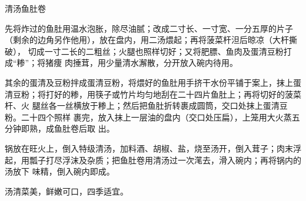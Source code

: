 %
%
%
%
%
%
%
\begin{recipe}{清汤鱼肚卷}

\ingredients


\preparation

\step 先将炸过的鱼肚用温水泡胀，除尽油腻；改成二寸长、一寸宽、一分五厚的片子
（剩余的边角另作他用），放在盘内，用二汤煨起；再将菠菜杆泹后晾凉（大杆撕破），
切成一寸二长的二粗丝；火腿也照样切好；又将肥膘、鱼肉及蛋清豆粉打成“糁”；将猪痩
肉捶茸，用少量清水澥散，分开放入碗内待用。

\step 其余的蛋清及豆粉拌成蛋清豆粉，将煨好的鱼肚用手挤干水份平铺于案上，抹上蛋
清豆粉；将打好的糁，用筷子或竹片均匀地刮在二十四片鱼肚上；再将切好的菠菜杆、火
腿丝各一丝横放于糁上；然后把鱼肚折转裹成圆筒，交口处抹上蛋清豆粉。二十四个照样
裹完，放入抹上一层油的盘内（交口处压扁），上笼用大火蒸五分钟即熟，成鱼肚卷后取
出。

\step 锅放在旺火上，倒入特级清汤，加料酒、胡椒、盐，烧至汤开，倒入茸子；肉末浮
起，用瓢子打尽浮沫及杂质；把鱼肚卷用清汤过一次滗去，滑入碗内；再将锅内的汤放下
味精，倒入碗内即成。

\features

汤清菜美，鲜嫩可口，四季适宜。

\end{recipe}

